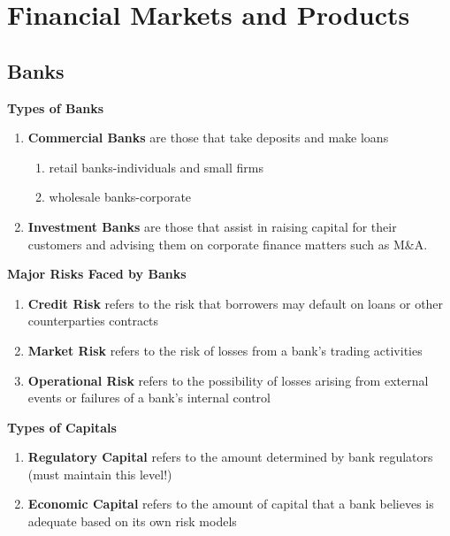 \documentclass[11pt,fleqn]{book} %
\numberwithin{equation}{section} %
\numberwithin{figure}{section} %
\numberwithin{table}{section} %
\begin{document}

\pagestyle{empty} %

\tableofcontents %

\pagestyle{fancy} %


\part{Financial Markets and Products}
\chapter{Banks}
\begin{definition}\textbf{Types of Banks}
\begin{enumerate}
    \item \textbf{Commercial Banks} are those that take deposits and make loans
    \begin{enumerate}
        \item retail banks-individuals and small firms
        \item wholesale banks-corporate
    \end{enumerate}
    \item \textbf{Investment Banks} are those that assist in raising capital for their customers and advising them on corporate finance matters such as M\&A.
\end{enumerate}
\end{definition}
\begin{definition}\textbf{Major Risks Faced by Banks}
\begin{enumerate}
    \item \textbf{Credit Risk} refers to the risk that borrowers may default on loans or other counterparties contracts
    \item \textbf{Market Risk} refers to the risk of losses from a bank's trading activities
    \item \textbf{Operational Risk} refers to the possibility of losses arising from external events or failures of a bank's internal control
\end{enumerate}
\end{definition}
\begin{definition}\textbf{Types of Capitals}
\begin{enumerate}
    \item \textbf{Regulatory Capital} refers to the amount determined by bank regulators (must maintain this level!)
    \item \textbf{Economic Capital} refers to the amount of capital that a bank believes is adequate based on its own risk models
\end{enumerate}
\end{definition}
\end{document}
